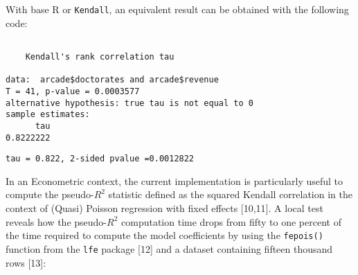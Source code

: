 \documentclass[
  10pt,
  letterpaper,
]{article}
\newenvironment{Shaded}{\begin{snugshade}}{\end{snugshade}}
\newcommand{\AttributeTok}[1]{\textcolor[rgb]{0.40,0.45,0.13}{#1}}
\newcommand{\FunctionTok}[1]{\textcolor[rgb]{0.28,0.35,0.67}{#1}}
\newcommand{\NormalTok}[1]{\textcolor[rgb]{0.00,0.23,0.31}{#1}}
\newcommand{\SpecialCharTok}[1]{\textcolor[rgb]{0.37,0.37,0.37}{#1}}
\newcommand{\StringTok}[1]{\textcolor[rgb]{0.13,0.47,0.30}{#1}}
\begin{document}
With base R or \texttt{Kendall}, an equivalent result can be obtained
with the following code:

\begin{Shaded}
\end{Shaded}

\begin{verbatim}

    Kendall's rank correlation tau

data:  arcade$doctorates and arcade$revenue
T = 41, p-value = 0.0003577
alternative hypothesis: true tau is not equal to 0
sample estimates:
      tau 
0.8222222 
\end{verbatim}

\begin{Shaded}
\end{Shaded}

\begin{verbatim}
tau = 0.822, 2-sided pvalue =0.0012822
\end{verbatim}

In an Econometric context, the current implementation is particularly
useful to compute the pseudo-\(R^2\) statistic defined as the squared
Kendall correlation in the context of (Quasi) Poisson regression with
fixed effects {[}10,11{]}. A local test reveals how the pseudo-\(R^2\)
computation time drops from fifty to one percent of the time required to
compute the model coefficients by using the \texttt{fepois()} function
from the \texttt{lfe} package {[}12{]} and a dataset containing fifteen
thousand rows {[}13{]}:
\end{document}
